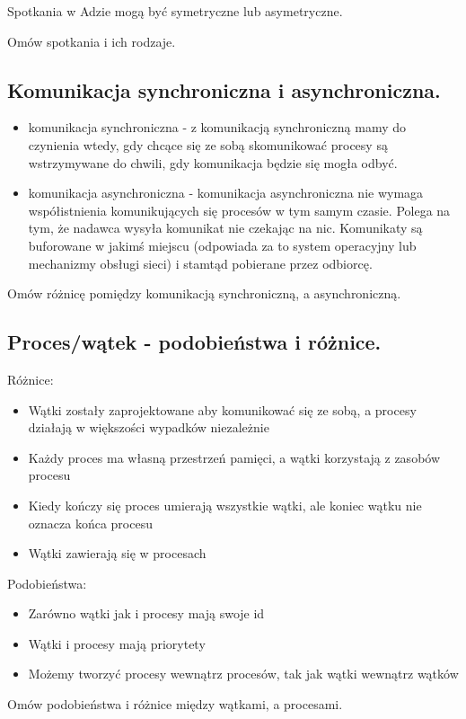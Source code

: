 \documentclass[a4paper,15pt]{article}
\newcommand{\ask}[2]{
    \begin{tcolorbox}[colback=black!5!white,colframe=gray,title={Pytanie #1}]
        #2
    \end{tcolorbox}
}
\begin{document}
Spotkania w Adzie mogą być symetryczne lub asymetryczne.

\ask{}{
Omów spotkania i ich rodzaje.
}

\subsection{Komunikacja synchroniczna i asynchroniczna.}

\begin{itemize}
\item komunikacja synchroniczna - z komunikacją synchroniczną mamy do czynienia wtedy, gdy chcące się ze sobą skomunikować procesy są wstrzymywane do chwili, gdy komunikacja będzie się mogła odbyć.
\item komunikacja asynchroniczna - komunikacja asynchroniczna nie wymaga współistnienia komunikujących się procesów w tym samym czasie. Polega na tym, że nadawca wysyła komunikat nie czekając na nic. Komunikaty są buforowane w jakimś miejscu (odpowiada za to system operacyjny lub mechanizmy obsługi sieci) i stamtąd pobierane przez odbiorcę.
\end{itemize}

\ask{}{
Omów różnicę pomiędzy komunikacją synchroniczną, a asynchroniczną.
}

\subsection{Proces/wątek - podobieństwa i różnice.}
Różnice:
\begin{itemize}
\item Wątki zostały zaprojektowane aby komunikować się ze sobą, a procesy działają w większości wypadków niezależnie
\item Każdy proces ma własną przestrzeń pamięci, a wątki korzystają z zasobów procesu
\item Kiedy kończy się proces umierają wszystkie wątki, ale koniec wątku nie oznacza końca procesu
\item Wątki zawierają się w procesach
\end{itemize}

Podobieństwa:
\begin{itemize}
\item Zarówno wątki jak i procesy mają swoje id
\item Wątki i procesy mają priorytety
\item Możemy tworzyć procesy wewnątrz procesów, tak jak wątki wewnątrz wątków
\end{itemize}

\ask{}{
Omów podobieństwa i różnice między wątkami, a procesami.
}
\end{document}
